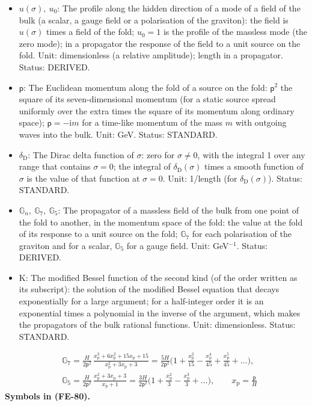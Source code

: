 \documentclass[
  10pt,
]{article}
\begin{document}
\begin{itemize}
  Status: STANDARD.
\item
  \(u(\sigma),\ u_0\): The profile along the hidden direction of a mode
  of a field of the bulk (a scalar, a gauge field or a polarisation of
  the graviton): the field is \(u(\sigma)\) times a field of the fold;
  \(u_0 = 1\) is the profile of the massless mode (the zero mode); in a
  propagator the response of the field to a unit source on the fold.
  Unit: dimensionless (a relative amplitude); length in a propagator.
  Status: DERIVED.
\item
  \(\mathsf{p}\): The Euclidean momentum along the fold of a source on
  the fold: \(\mathsf{p}^2\) the square of its seven-dimensional
  momentum (for a static source spread uniformly over the extra times
  the square of its momentum along ordinary space);
  \(\mathsf{p} = -\mathrm{i}m\) for a time-like momentum of the mass
  \(m\) with outgoing waves into the bulk. Unit: GeV. Status: STANDARD.
\item
  \(\delta_{\mathrm{D}}\): The Dirac delta function of \(\sigma\): zero
  for \(\sigma \ne 0\), with the integral 1 over any range that contains
  \(\sigma = 0\); the integral of \(\delta_{\mathrm{D}}(\sigma)\) times
  a smooth function of \(\sigma\) is the value of that function at
  \(\sigma = 0\). Unit: 1/length (for \(\delta_{\mathrm{D}}(\sigma)\)).
  Status: STANDARD.
\item
  \(\mathbb{G}_n,\ \mathbb{G}_7,\ \mathbb{G}_5\): The propagator of a
  massless field of the bulk from one point of the fold to another, in
  the momentum space of the fold: the value at the fold of its response
  to a unit source on the fold; \(\mathbb{G}_7\) for each polarisation
  of the graviton and for a scalar, \(\mathbb{G}_5\) for a gauge field.
  Unit: GeV\(^{-1}\). Status: DERIVED.
\item
  \(\mathrm{K}\): The modified Bessel function of the second kind (of
  the order written as its subscript): the solution of the modified
  Bessel equation that decays exponentially for a large argument; for a
  half-integer order it is an exponential times a polynomial in the
  inverse of the argument, which makes the propagators of the bulk
  rational functions. Unit: dimensionless. Status: STANDARD.
\end{itemize}

\[
\begin{aligned}
&\mathbb{G}_7 = \frac{H}{2\mathsf{p}^2}\,\frac{x_{\mathrm{p}}^3 + 6x_{\mathrm{p}}^2 + 15x_{\mathrm{p}} + 15}{x_{\mathrm{p}}^2 + 3x_{\mathrm{p}} + 3}
 = \frac{5H}{2\mathsf{p}^2}\Big(1 + \frac{x_{\mathrm{p}}^2}{15} - \frac{x_{\mathrm{p}}^4}{45} + \frac{x_{\mathrm{p}}^5}{45} + \dots\Big),\\
&\mathbb{G}_5 = \frac{H}{2\mathsf{p}^2}\,\frac{x_{\mathrm{p}}^2 + 3x_{\mathrm{p}} + 3}{x_{\mathrm{p}} + 1}
 = \frac{3H}{2\mathsf{p}^2}\Big(1 + \frac{x_{\mathrm{p}}^2}{3} - \frac{x_{\mathrm{p}}^3}{3} + \dots\Big),\qquad x_{\mathrm{p}} = \frac{\mathsf{p}}{H}
\end{aligned} \tag{FE-80}
\] \textbf{Symbols in (FE-80).}
\end{document}
